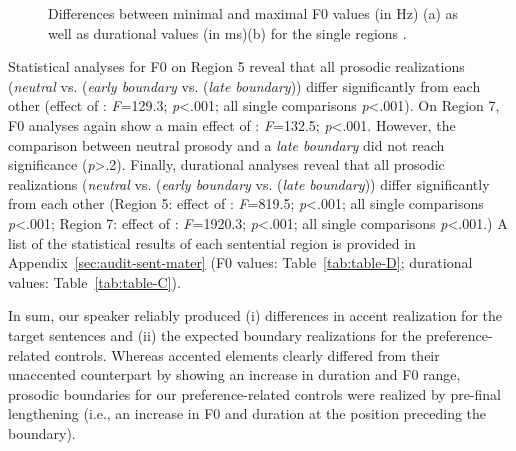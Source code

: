 \documentclass[fleqn,reqno,10pt]{article}
\begin{document}
\begin{figure}[t]
{
	    \label{fig:duration_fi}
	}
	\caption[]{Differences between minimal and maximal F0 values (in Hz) (a) as well
	as durational values (in ms)(b) for 
	the single regions  .}
	\label{fig:acoustics_fi}
\end{figure}


Statistical analyses for F0 on Region 5 reveal that all prosodic
realizations (\emph{neutral} vs. (\emph{early boundary}
vs. (\emph{late boundary})) differ significantly from each other
(effect of : \emph{F}=129.3; \emph{p}<.001; all single
comparisons \emph{p}<.001). On Region 7, F0 analyses again show a main
effect of : \emph{F}=132.5; \emph{p}<.001. However, the
comparison between neutral prosody and a \emph{late boundary} did not
reach significance (\emph{p}>.2). Finally, durational analyses reveal
that all prosodic realizations (\emph{neutral} vs. (\emph{early
  boundary} vs. (\emph{late boundary})) differ significantly from each
other (Region 5: effect of : \emph{F}=819.5;
\emph{p}<.001; all single comparisons \emph{p}<.001; Region 7: effect
of : \emph{F}=1920.3; \emph{p}<.001; all single
comparisons \emph{p}<.001.) A list of the statistical results of each
sentential region is provided in Appendix~\ref{sec:audit-sent-mater}
(F0 values: Table~\ref{tab:table-D}; durational values:
Table~\ref{tab:table-C}).

In sum, our speaker reliably
produced (i) differences in accent realization for the target
sentences and (ii) the expected boundary realizations for the
preference-related controls. Whereas accented elements clearly
differed from their unaccented counterpart by showing an increase in
duration and F0 range, prosodic boundaries for our preference-related
controls were realized by pre-final lengthening (i.e., an increase in F0
and duration at the position preceding the boundary).
\end{document}

